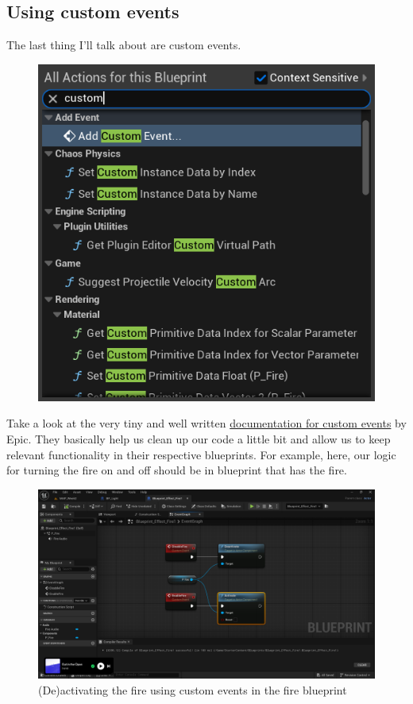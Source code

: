\documentclass[]{article}
\begin{document}
	\subsection{Using custom events}
	The last thing I'll talk about are custom events.
	
	\begin{figure}[hb!]
		\centering
		\includegraphics[width=0.55\linewidth]{day4images/screenshot019}
	\end{figure}
	
	Take a look at the very tiny and well written \href{https://dev.epicgames.com/documentation/en-us/unreal-engine/custom-events-in-unreal-engine}{documentation for custom events} by Epic. They basically help us clean up our code a little bit and allow us to keep relevant functionality in their respective blueprints. For example, here, our logic for turning the fire on and off should be in blueprint that has the fire.
	
	\begin{figure}[h]
		\centering
		\includegraphics[width=0.8\linewidth]{day4images/screenshot020}
		\caption{(De)activating the fire using custom events in the fire blueprint}
		\label{fig:screenshot020}
	\end{figure}
	
\end{document}
